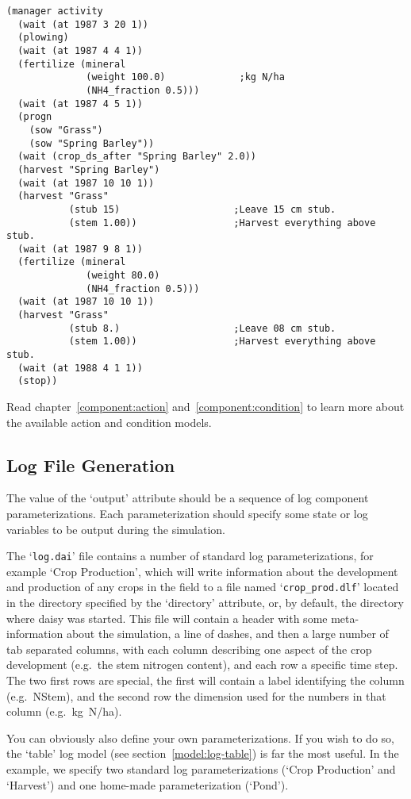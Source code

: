 \begin{verbatim}
(manager activity
  (wait (at 1987 3 20 1))
  (plowing)
  (wait (at 1987 4 4 1))
  (fertilize (mineral 
              (weight 100.0)             ;kg N/ha
              (NH4_fraction 0.5)))
  (wait (at 1987 4 5 1))
  (progn 
    (sow "Grass")
    (sow "Spring Barley"))
  (wait (crop_ds_after "Spring Barley" 2.0))
  (harvest "Spring Barley")
  (wait (at 1987 10 10 1))
  (harvest "Grass"
           (stub 15)                    ;Leave 15 cm stub.
           (stem 1.00))                 ;Harvest everything above stub.
  (wait (at 1987 9 8 1))
  (fertilize (mineral
              (weight 80.0)
              (NH4_fraction 0.5)))
  (wait (at 1987 10 10 1))
  (harvest "Grass"
           (stub 8.)                    ;Leave 08 cm stub.
           (stem 1.00))                 ;Harvest everything above stub.
  (wait (at 1988 4 1 1))
  (stop))
\end{verbatim}

Read chapter~\ref{component:action} and~\ref{component:condition} to
learn more about the available action and condition models.

\subsection{Log File Generation}

The value of the `output' attribute should be a sequence of log
component parameterizations.  Each parameterization should specify
some state or log variables to be output during the simulation.

The `\texttt{log.dai}' file contains a number of standard log
parameterizations, for example `Crop Production', which will write
information about the development and production of any crops in the
field to a file named `\texttt{crop\_prod.dlf}' located in the
directory specified by the `directory' attribute, or, by default, the
directory where daisy was started.  This file will contain a header
with some meta-information about the simulation, a line of dashes, and
then a large number of tab separated columns, with each column
describing one aspect of the crop development (e.g.\ the stem nitrogen
content), and each row a specific time step.  The two first rows are
special, the first will contain a label identifying the column (e.g.\ 
NStem), and the second row the dimension used for the numbers in that
column (e.g.\ kg~N/ha).

You can obviously also define your own parameterizations.  If you wish
to do so, the `table' log model (see section~\ref{model:log-table})
is far the most useful.  In the example, we specify two standard log
parameterizations (`Crop Production' and `Harvest') and one home-made
parameterization (`Pond').

